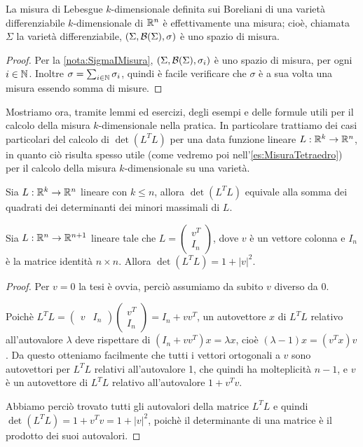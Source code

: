 \begin{theorem}
	La misura di Lebesgue $k$-dimensionale definita sui Boreliani di una varietà differenziabile $k$-dimensionale di $\mathbb R^n$ è effettivamente una misura; cioè, chiamata $\Sigma$ la varietà differenziabile, $(\Sigma,\mathcal B(\Sigma),\sigma)$ è uno spazio di misura.
\end{theorem}
\begin{proof}
	Per la \cref{nota:SigmaIMisura}, $(\Sigma,\mathcal B(\Sigma),\sigma_i)$ è uno spazio di misura, per ogni $i\in\mathbb N$. Inoltre $\sigma=\sum_{i\in\mathbb N}\sigma_i$, quindi è facile verificare che $\sigma$ è a sua volta una misura essendo somma di misure.
\end{proof}

Mostriamo ora, tramite lemmi ed esercizi, degli esempi e delle formule utili per il calcolo della misura $k$-dimensionale nella pratica. In particolare trattiamo dei casi particolari del calcolo di $\det(L^TL)$ per una data funzione lineare $L:\mathbb R^k\to\mathbb R^n$, in quanto ciò risulta spesso utile (come vedremo poi nell'\cref{es:MisuraTetraedro}) per il calcolo della misura $k$-dimensionale su una varietà.

\begin{exercise}\label{es:DeterminanteProdottoTrasposta}
	Sia $L:\mathbb R^k\to\mathbb R^n$ lineare con $k\le n$, allora $\det(L^TL)$ equivale alla somma dei quadrati dei determinanti dei minori massimali di $L$.
\end{exercise}

\begin{lemma}\label{lemma:DeterminanteMatriceQuasiIdentita}
	Sia $L:\mathbb R^n\to\mathbb R^{n+1}$ lineare tale che $L=\begin{pmatrix} v^T \\ I_n \end{pmatrix}$, dove $v$ è un vettore colonna e $I_n$ è la matrice identità $n\times n$. Allora $\det(L^TL)=1+\lvert v \rvert ^2$.
\end{lemma}
\begin{proof}
	Per $v=0$ la tesi è ovvia, perciò assumiamo da subito $v$ diverso da 0.
	
	Poichè $L^TL=\begin{pmatrix} v & I_n \end{pmatrix}\begin{pmatrix} v^T \\ I_n \end{pmatrix}=I_n+vv^T$, un autovettore $x$ di $L^TL$ relativo all'autovalore $\lambda$ deve rispettare di $(I_n+vv^T)x=\lambda x$, cioè $(\lambda-1)x=(v^Tx)v$. Da questo otteniamo facilmente che tutti i vettori ortogonali a $v$ sono autovettori per $L^TL$ relativi all'autovalore 1, che quindi ha molteplicità $n-1$, e $v$ è un autovettore di $L^TL$ relativo all'autovalore $1+v^Tv$.
	
	Abbiamo perciò trovato tutti gli autovalori della matrice $L^TL$ e quindi $\det(L^TL)=1+v^Tv=1+\lvert v \rvert ^2$, poichè il determinante di una matrice è il prodotto dei suoi autovalori.
\end{proof}

